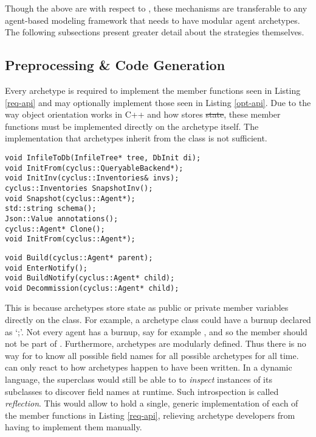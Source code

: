 Though the above are with respect to \cyclus, these mechanisms are 
transferable to any agent-based modeling framework that needs to have modular agent 
archetypes. The following subsections present greater detail about the 
strategies themselves.

\subsection{Preprocessing \& Code Generation}
\label{subsec-ppgc}

Every \cyclus archetype is required to implement the member functions 
seen in Listing \ref{req-api} and may optionally implement those seen in 
Listing \ref{opt-api}. Due to the way object orientation works in 
C++ and how \cyclus stores \sout{state}, these member functions must be implemented directly
on the archetype itself. The implementation that archetypes inherit 
from the  class is not sufficient. 

\begin{lstlisting}[caption={Required Archetype API}, label=req-api]
void InfileToDb(InfileTree* tree, DbInit di);
void InitFrom(cyclus::QueryableBackend*);
void InitInv(cyclus::Inventories& invs);
cyclus::Inventories SnapshotInv();
void Snapshot(cyclus::Agent*);
std::string schema();
Json::Value annotations();
cyclus::Agent* Clone();
void InitFrom(cyclus::Agent*);
\end{lstlisting}

\begin{lstlisting}[caption={Optional Archetype API}, label=opt-api]
void Build(cyclus::Agent* parent);
void EnterNotify();
void BuildNotify(cyclus::Agent* child);
void Decommission(cyclus::Agent* child);
\end{lstlisting}

 This is because archetypes store state as public or private member variables
directly on the class.  For example, a  archetype class
could have a burnup declared as `;'. Not every agent has 
a burnup, say for example , and so the  member 
should not be part of . Furthermore, archetypes are modularly 
defined. Thus there is no way for \cyclus to know all possible field names 
for all possible archetypes for all time.  \Cyclus can only react to how 
archetypes happen to have been written. In a dynamic language, the 
superclass would still be able to to \emph{inspect} instances of its subclasses
to discover field names at runtime. Such introspection is called \emph{reflection}. 
This would allow  to hold a single, generic implementation of each of the
member functions in Listing \ref{req-api}, relieving archetype developers from 
having to implement them manually.

